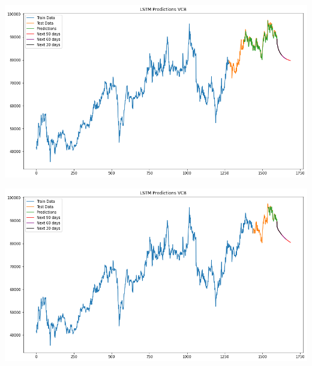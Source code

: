 \documentclass[conference]{IEEEtran}
\begin{document}
\begin{minipage}{0.21\textwidth}
    \centering
    \includegraphics[width=\linewidth]{images/LSTM/LSTM_VCB_82.png}
    \label{fig:image1}
\end{minipage}
\hfill
\begin{minipage}{0.21\textwidth}
    \centering
    \includegraphics[width=\linewidth]{images/LSTM/LSTM_VCB_91.png}
    \label{fig:image2}
\end{minipage}
\end{document}
